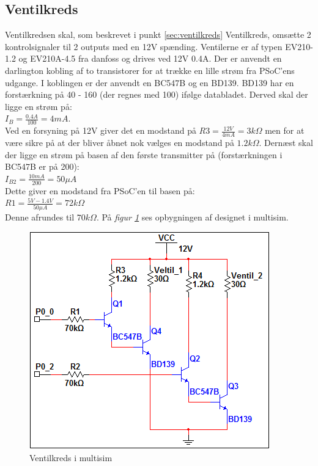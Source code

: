 \subsection{Ventilkreds}
Ventilkredsen skal, som beskrevet i punkt \ref{sec:ventilkreds} Ventilkreds, omsætte 2 kontrolsignaler til 2 outputs med en 12V spænding. Ventilerne er af typen EV210-1.2 og EV210A-4.5 fra danfoss og drives ved 12V 0.4A. Der er anvendt en darlington kobling af to transistorer for at trække en lille strøm fra PSoC'ens udgange. I koblingen er der anvendt en BC547B og en BD139. BD139 har en forstærkning på 40 - 160 (der regnes med 100) ifølge databladet. Derved skal der ligge en strøm på:\\
$I_{B}=\frac{0.4A}{100}=4mA$. \\
Ved en forsyning på 12V giver det en modstand på $R3=\frac{12V}{4mA}=3k\Omega$ men for at være sikre på at der bliver åbnet nok vælges en modstand på $1.2k\Omega$.
Dernæst skal der ligge en strøm på basen af den første transmitter på (forstærkningen i BC547B er på 200):\\
$I_{B2}=\frac{10m A}{200}=50\mu A$\\
Dette giver en modstand fra PSoC'en til basen på:\\
$R1=\frac{5V-1.4V}{50\mu A}=72k\Omega$\\
Denne afrundes til $70k\Omega$. På \textit{figur \ref{fig:ventilkreds}} ses opbygningen af designet i multisim.
\begin{figure}[H]
\centering
\includegraphics[scale=.75]{billeder/ventilkreds}
\caption{Ventilkreds i multisim}
\label{fig:ventilkreds}
\end{figure}
